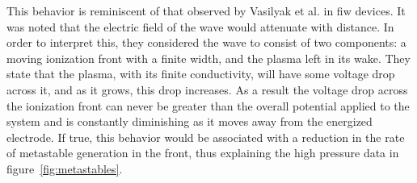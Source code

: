 This behavior is reminiscent of that observed by Vasilyak et al.
\cite{Vasilyak1994} in \acs{fiw} devices. It was noted that the electric field
of the wave would attenuate with distance. In order to interpret this, they
considered the wave to consist of two components: a moving ionization front with
a finite width, and the plasma left in its wake. They state that the plasma,
with its finite conductivity, will have some voltage drop across it, and as it
grows, this drop increases. As a result the voltage drop across the ionization
front can never be greater than the overall potential applied to the system and
is constantly diminishing as it moves away from the energized electrode. If
true, this behavior would be associated with a reduction in the rate of
metastable generation in the front, thus explaining the high pressure data in
figure~\ref{fig:metastables}.

